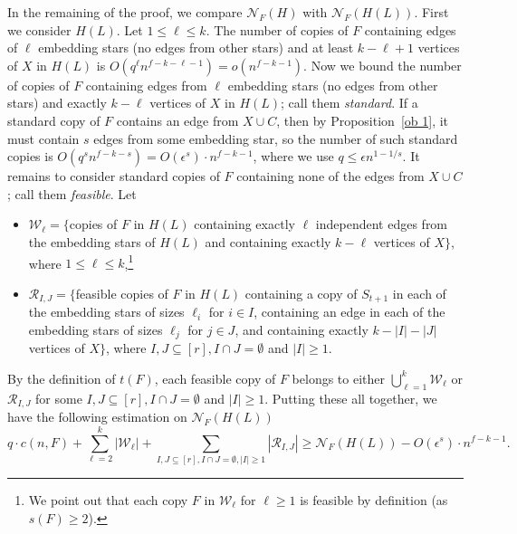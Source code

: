 \documentclass[10pt]{article}
\begin{document}
In the remaining of the proof, we compare $\mathcal{N}_F(H)$ with $\mathcal{N}_F(H(L))$.
First we consider $H(L)$.
Let $1\leq \ell\leq k$. The number of copies of $F$ containing edges of $\ell$ embedding stars (no edges from other stars) and at least $k-\ell+1$ vertices of $X$ in $H(L)$ is $O(q^\ell n^{f-k-\ell-1})=o(n^{f-k-1})$.
Now we bound the number of copies of $F$ containing edges from $\ell$ embedding stars (no edges from other stars) and exactly $k-\ell$ vertices of $X$ in $H(L)$; call them {\it standard}.
If a standard copy of $F$ contains an edge from $X\cup C$, then by Proposition~\ref{ob 1}, it must contain $s$ edges from some embedding star,
so the number of such standard copies is $O(q^s n^{f-k-s})=O(\epsilon^s)\cdot n^{f-k-1}$, where we use $q\leq \epsilon n^{1-1/s}$.
It remains to consider standard copies of $F$ containing none of the edges from $X\cup C$; call them {\it feasible}.
Let
\begin{itemize}
\item  $\mathcal{W}_\ell=\{$copies of $F$ in $H(L)$ containing exactly $\ell$ independent edges from the embedding stars of $H(L)$ and containing exactly $k-\ell$ vertices of $X\}$, where $1\leq \ell\leq k$,\footnote{We point out that each copy $F$ in $\mathcal{W}_\ell$ for $\ell\geq 1$ is feasible by definition (as $s(F)\geq 2$).}
\item  $\mathcal{R}_{I,J}=\{$feasible copies of $F$ in $H(L)$ containing a copy of $S_{t+1}$
     in each of the embedding stars of sizes $\ell_i$ for $i\in I$,
containing an edge in each of the embedding stars of sizes $\ell_j$ for $j\in J$, and containing exactly $k-|I|-|J|$ vertices of $X\}$, where $I,J\subseteq [r],I\cap J=\emptyset$ and $|I|\geq 1$.
\end{itemize}
By the definition of $t(F)$, each feasible copy of $F$ belongs to either $\bigcup_{\ell=1}^k \mathcal{W}_\ell$ or $\mathcal{R}_{I,J}$ for some $I,J\subseteq [r], I\cap J=\emptyset$ and $|I|\geq 1$.
Putting these all together, we have the following estimation on $\mathcal{N}_F(H(L))$
\begin{equation}\label{eq-for-compare}
q\cdot c(n,F) +\sum_{\ell=2}^{k}|\mathcal{W}_\ell|+\sum_{I,J\subseteq [r],I\cap J=\emptyset, |I|\geq 1}|\mathcal{R}_{I,J}|\geq \mathcal{N}_F(H(L))-O(\epsilon^s)\cdot n^{f-k-1}.
\end{equation}
\end{document}
